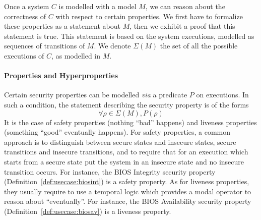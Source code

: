 Once a system $C$ is modelled with a model $M$, we can reason about the
correctness of $C$ with respect to certain properties. We first have to
formalize these properties as a statement about $M$, then we exhibit a proof
that this statement is true.
%
This statement is based on the system executions, modelled  as sequences of transitions of $M$.
%
We denote $\Sigma(M)$ the set of all the possible executions of $C$, as modelled
in $M$.


\paragraph{Properties and Hyperproperties}
%
Certain security properties can be modelled \emph{via} a predicate $P$ on
executions. 
%
In such a condition, the statement describing the security property is of the
forms
%
\[
  \forall \rho \in \Sigma(M), P(\rho)
\]
%
It is the case of safety properties (nothing ``bad'' happens) and liveness
properties (something ``good'' eventually happens).
%
For safety properties, a common approach is to distinguish between secure states
and insecure states, secure transitions and insecure transitions, and to require
that for an execution which starts from a secure state put the system in an
insecure state and no insecure transition occurs. 
%
For instance, the BIOS Integrity security property
(Definition~\ref{def:usecase:biosint}) is a safety property. 
%
As for liveness properties, they usually require to use a temporal logic which
provides a modal operator to reason about ``eventually''. 
%
For instance, the BIOS Availability security property
(Definition~\ref{def:usecase:biosav}) is a liveness property. 


